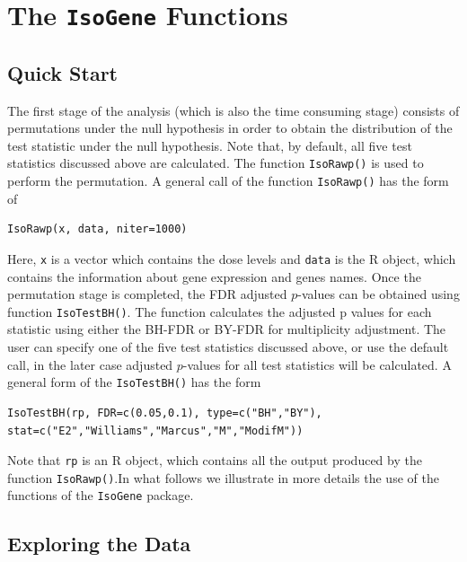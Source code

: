 \documentclass[10pt]{article}
\newenvironment{boxit}{\begin{lrbox}{\savepar}
\begin{minipage}[b]{5.0in}}
{\end{minipage}\end{lrbox}\fbox{\usebox{\savepar}}}
\begin{document}
\section{The \texttt{IsoGene} Functions}
\subsection{Quick Start}
The first stage of the analysis (which is also the time consuming stage) consists of permutations under the null hypothesis in order to obtain the distribution of the test statistic under the null hypothesis. Note that, by default, all five test statistics discussed above are calculated. The function \texttt{IsoRawp()} is used to perform the permutation. A general call of the function \texttt{IsoRawp()} has the form of
\begin{center}
\begin{boxit}
\begin{verbatim}
IsoRawp(x, data, niter=1000)
\end{verbatim}
\end{boxit}
\end{center}
Here, \texttt{x} is a vector which contains the dose levels and \texttt{data} is the R object, which contains the information about gene expression and genes names. Once the permutation stage is completed, the FDR adjusted $p$-values can be obtained using function \texttt{IsoTestBH()}. The function calculates the adjusted p values for each statistic using either the BH-FDR or BY-FDR for multiplicity adjustment. The user can specify one of the five test statistics discussed above, or use the default call, in the later case adjusted $p$-values for all test statistics will be calculated. A general form of the \texttt{IsoTestBH()} has the form
\begin{center}
\begin{boxit}
\begin{verbatim}
IsoTestBH(rp, FDR=c(0.05,0.1), type=c("BH","BY"),
stat=c("E2","Williams","Marcus","M","ModifM"))
\end{verbatim}
\end{boxit}
\end{center}
Note that \texttt{rp} is an R object, which contains all the output produced by the function \texttt{IsoRawp()}.\newline In what follows we illustrate in more details the use of the functions of the \texttt{IsoGene} package.

\subsection{Exploring the Data}
\end{document}
